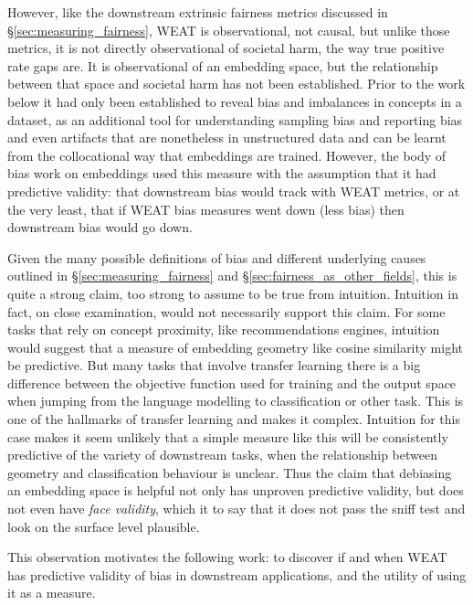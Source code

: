 However, like the downstream extrinsic fairness metrics discussed in \S \ref{sec:measuring_fairness}, WEAT is observational, not causal, but unlike those metrics, it is not directly observational of societal harm, the way true positive rate gaps are. It is observational of an embedding space, but the relationship between that space and societal harm has not been established. Prior to the work below it had only been established to reveal bias and imbalances in concepts in a dataset, as an additional tool for understanding sampling bias and reporting bias and even artifacts that are nonetheless in unstructured data and can be learnt from the collocational way that embeddings are trained. However, the body of bias work on embeddings used this measure with the assumption that it had predictive validity: that downstream bias would track with WEAT metrics, or at the very least, that if WEAT bias measures went down (less bias) then downstream bias would go down.

Given the many possible definitions of bias and different underlying causes outlined in \S \ref{sec:measuring_fairness} and \S \ref{sec:fairness_as_other_fields}, this is quite a strong claim, too strong to assume to be true from intuition. Intuition in fact, on close examination, would not necessarily support this claim. For some tasks that rely on concept proximity, like recommendations engines, intuition would suggest that a measure of embedding geometry like cosine similarity might be predictive. But many tasks that involve transfer learning there is a big difference between the objective function used for training and the output space when jumping from the language modelling to classification or other task. This is one of the hallmarks of transfer learning and makes it complex. Intuition for this case makes it seem unlikely that a simple measure like this will be consistently predictive of the variety of downstream tasks, when the relationship between geometry and classification behaviour is unclear. Thus the claim that debiasing an embedding space is helpful not only has unproven predictive validity, but does not even have \textit{face validity}, which it to say that it does not pass the sniff test and look on the surface level plausible.  

This observation motivates the following work: to discover if and when WEAT has predictive validity of bias in downstream applications, and the utility of using it as a measure.  